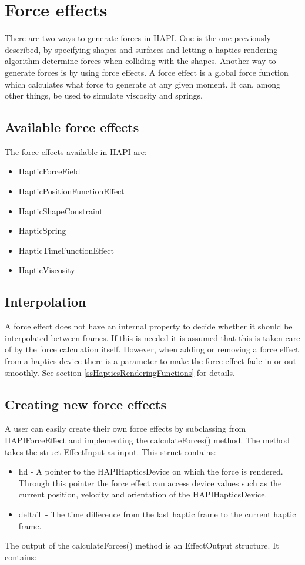 \chapter{Force effects}
There are two ways to generate forces in HAPI. One is the one
previously described, by specifying shapes and surfaces and letting
a haptics rendering algorithm determine forces when colliding with the
shapes. Another way to generate forces is by using force effects. A
force effect is a global force function which calculates what force to
generate at any given moment. It can, among other things, be used to simulate
viscosity and springs. 

\section{Available force effects}
The force effects available in HAPI are:

\begin{itemize}
\item HapticForceField
\item HapticPositionFunctionEffect
\item HapticShapeConstraint
\item HapticSpring
\item HapticTimeFunctionEffect 
\item HapticViscosity
\end{itemize}

\section{Interpolation}
A force effect does not have an internal property to decide whether it
should be interpolated between frames. If this is needed it is assumed
that this is taken care of by the force calculation itself. However,
when adding or removing a force effect from a haptics device there
is a parameter to make the force effect fade in or out smoothly. See section
\ref{ssHapticsRenderingFunctions} for details.

\section{Creating new force effects}
A user can easily create their own force effects by subclassing from
HAPIForceEffect and implementing the calculateForces() method. The
method takes the struct EffectInput as input. This struct contains:

\begin{itemize}
\item hd - A pointer to the HAPIHapticsDevice on which the force is rendered.
Through this pointer the force effect can access device values such as
the current position, velocity and orientation of the HAPIHapticsDevice.
\item deltaT - The time difference from the last haptic frame to the current
haptic frame.
\end{itemize}
The output of the calculateForces() method is an EffectOutput structure.
It contains:

